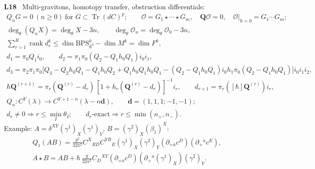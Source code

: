 \documentclass[10pt,a4paper]{article}
\numberwithin{equation}{section}
\newcommand{\cO}{\mathcal O}
\newcommand{\LL}[2]{\textsf{L}(#1){\scriptsize\,\texttt{#2}}}
\newcommand{\LT}[3]{\textsf{L}\,#1\,#2{\scriptsize\,\texttt{#3}}}
\newcommand{\rid}[1]{\par\medskip\noindent\textbf{#1}\ }
\newcommand{\ptr}[2]{\par\nopagebreak{\footnotesize\raggedleft[\,#1\ $\mid$\ #2\,]\par}}
\newcommand{\st}[1]{\textsf{#1}}
\begin{document}
\rid{L18} Multi-gravitons, homotopy transfer, obstruction differentials:
\begin{gather*}
Q_nG=0\ (n\ge0)\ \text{for }G\subset\operatorname{Tr}(dC)^p;\qquad\cO=G_1\star\cdots\star G_m,\quad\mathbf Q\cO=0,\quad\cO|_{\hbar=0}=G_1\cdots G_m;\\
\deg_\theta(Q_nX)=\deg_\theta X-3n,\qquad\deg_\theta\cO_n=\deg_\theta\cO_0-3n,\\
\sum_{r=1}^R\operatorname{rank}d_r^k\le\dim\mathrm{BPS}^k_{\hbar^0}-\dim M^k=\dim F^k,\\
d_1=\pi_0Q_1i_0,\qquad d_2=\pi_1\pi_0(Q_2-Q_1h_0Q_1)i_0i_1,\\
d_3=\pi_2\pi_1\pi_0\big[Q_3-Q_2h_0Q_1-Q_1h_0Q_2+Q_1h_0Q_1h_0Q_1-(Q_2-Q_1h_0Q_1)i_0h_1\pi_0(Q_2-Q_1h_0Q_1)\big]i_0i_1i_2,\\
\hbar\mathbf Q^{(r+1)}=\pi_r(\mathbf Q^{(r)}-d_r)\,[1+h_r(\mathbf Q^{(r)}-d_r)]^{-1}i_r,\qquad d_{r+1}=\pi_r([\hbar]\mathbf Q^{(r)})i_r,\\
Q_n:C^Y(\lambda)\to C^{Y+1-n}(\lambda-n\mathbf d),\qquad\mathbf d=(1,1,1;-1,-1);\\
d_r\ne0\Rightarrow r\le\min_I\theta_I;\qquad d_r\text{-exact}\Rightarrow r\le\min(n_+,n_-).
\end{gather*}
Example: $A=\delta^{XY}(\gamma^1)_X(\gamma^1)_Y$, $B=(\gamma^2)_X(\beta_1)^X$:
\begin{gather*}
Q_1(AB)=\frac{g^2}{32\pi^2}C^X{}_{RD}C^{YR}{}_E(\gamma^1)_X(\gamma^2)_Y(\partial_{+\dot a}c^D)(\partial_+{}^{\dot a}c^E),\\
A\star B=AB+\hbar\,\frac g{32\pi^2}C_D{}^{XY}(\partial_{+\dot a}c^D)(\partial_+{}^{\dot a}(\gamma^1)_X)(\gamma^2)_Y .
\end{gather*}
\ptr{\LT{Thm}{9.1}{b-00630} \LL{9.2}{eq-multigraviton-closure}, \LL{9.5}{eq-2-60}; \LL{A.8}{eq-2-63}, \LL{A.9}{eq-graviton-differential-degree}; \LT{Cor.}{9.4}{cor-ch9-fortuitous-bound} \LL{9.42}{eq-ch9-fortuitous-rank-bound}$=$\LL{2.21}{eq-sum-rank}; \LL{9.33}{b-00699}; \LT{Prop.}{9.2}{prop-ch8-transfer-validity} \LL{9.22}{eq-page-transfer}; \LL{A.12}{eq-E-grading}, \LT{Cor.}{A.2}{b-00758}; \LL{9.10}{eq-scalarfermionQ1}, \LL{9.11}{eq-2-65}, \LL{9.15}{eq-finiteexample}}{\st{P}}
\end{document}
